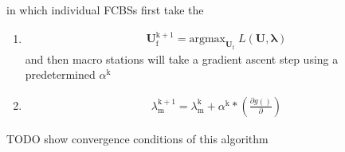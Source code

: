 \documentclass[12pt]{article}
\begin{document}
in which individual FCBSs first take the
\begin{enumerate}
\item 
\begin{gather}
\mathbf{U^{\mathrm{k+1}}_{\mathrm{f}}} =\mathrm{argmax}_{\mathbf{U_{\mathrm{f}}}} \; L(\mathbf{U,\lambda})
\end{gather}
and then macro stations will take a gradient ascent step using a 
predetermined $\alpha^{\mathrm{k}}$
\item 
\begin{gather}
\lambda_{\mathrm{m}}^{\mathrm{k+1}} = 
\lambda_{\mathrm{m}}^{\mathrm{k}}
+
\alpha^{\mathrm{k}}*
(\frac{\partial g()}{\partial})
\end{gather}


\end{enumerate} 

TODO show convergence conditions of this algorithm
\end{document}
